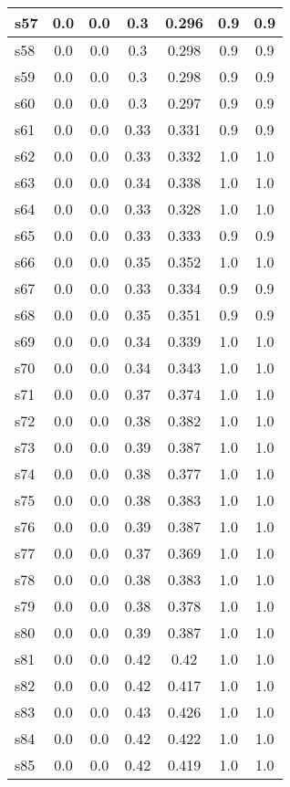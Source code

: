 \documentclass{article}
\begin{document}
\begin{tabular}{|l|c|c|c|c|c|c|}
\hline
s57 &0.0 & 0.0 & 0.3 & 0.296 & 0.9 & 0.9\\
\hline
s58 &0.0 & 0.0 & 0.3 & 0.298 & 0.9 & 0.9\\
\hline
s59 &0.0 & 0.0 & 0.3 & 0.298 & 0.9 & 0.9\\
\hline
s60 &0.0 & 0.0 & 0.3 & 0.297 & 0.9 & 0.9\\
\hline
s61 &0.0 & 0.0 & 0.33 & 0.331 & 0.9 & 0.9\\
\hline
s62 &0.0 & 0.0 & 0.33 & 0.332 & 1.0 & 1.0\\
\hline
s63 &0.0 & 0.0 & 0.34 & 0.338 & 1.0 & 1.0\\
\hline
s64 &0.0 & 0.0 & 0.33 & 0.328 & 1.0 & 1.0\\
\hline
s65 &0.0 & 0.0 & 0.33 & 0.333 & 0.9 & 0.9\\
\hline
s66 &0.0 & 0.0 & 0.35 & 0.352 & 1.0 & 1.0\\
\hline
s67 &0.0 & 0.0 & 0.33 & 0.334 & 0.9 & 0.9\\
\hline
s68 &0.0 & 0.0 & 0.35 & 0.351 & 0.9 & 0.9\\
\hline
s69 &0.0 & 0.0 & 0.34 & 0.339 & 1.0 & 1.0\\
\hline
s70 &0.0 & 0.0 & 0.34 & 0.343 & 1.0 & 1.0\\
\hline
s71 &0.0 & 0.0 & 0.37 & 0.374 & 1.0 & 1.0\\
\hline
s72 &0.0 & 0.0 & 0.38 & 0.382 & 1.0 & 1.0\\
\hline
s73 &0.0 & 0.0 & 0.39 & 0.387 & 1.0 & 1.0\\
\hline
s74 &0.0 & 0.0 & 0.38 & 0.377 & 1.0 & 1.0\\
\hline
s75 &0.0 & 0.0 & 0.38 & 0.383 & 1.0 & 1.0\\
\hline
s76 &0.0 & 0.0 & 0.39 & 0.387 & 1.0 & 1.0\\
\hline
s77 &0.0 & 0.0 & 0.37 & 0.369 & 1.0 & 1.0\\
\hline
s78 &0.0 & 0.0 & 0.38 & 0.383 & 1.0 & 1.0\\
\hline
s79 &0.0 & 0.0 & 0.38 & 0.378 & 1.0 & 1.0\\
\hline
s80 &0.0 & 0.0 & 0.39 & 0.387 & 1.0 & 1.0\\
\hline
s81 &0.0 & 0.0 & 0.42 & 0.42 & 1.0 & 1.0\\
\hline
s82 &0.0 & 0.0 & 0.42 & 0.417 & 1.0 & 1.0\\
\hline
s83 &0.0 & 0.0 & 0.43 & 0.426 & 1.0 & 1.0\\
\hline
s84 &0.0 & 0.0 & 0.42 & 0.422 & 1.0 & 1.0\\
\hline
s85 &0.0 & 0.0 & 0.42 & 0.419 & 1.0 & 1.0\\

\end{tabular}
\end{document}
